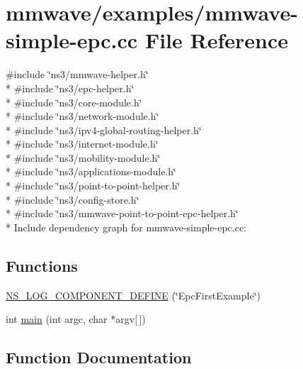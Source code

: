 \hypertarget{mmwave-simple-epc_8cc}{}\section{mmwave/examples/mmwave-\/simple-\/epc.cc File Reference}
\label{mmwave-simple-epc_8cc}
{\ttfamily \#include \char`\"{}ns3/mmwave-\/helper.\+h\char`\"{}}\\*
{\ttfamily \#include \char`\"{}ns3/epc-\/helper.\+h\char`\"{}}\\*
{\ttfamily \#include \char`\"{}ns3/core-\/module.\+h\char`\"{}}\\*
{\ttfamily \#include \char`\"{}ns3/network-\/module.\+h\char`\"{}}\\*
{\ttfamily \#include \char`\"{}ns3/ipv4-\/global-\/routing-\/helper.\+h\char`\"{}}\\*
{\ttfamily \#include \char`\"{}ns3/internet-\/module.\+h\char`\"{}}\\*
{\ttfamily \#include \char`\"{}ns3/mobility-\/module.\+h\char`\"{}}\\*
{\ttfamily \#include \char`\"{}ns3/applications-\/module.\+h\char`\"{}}\\*
{\ttfamily \#include \char`\"{}ns3/point-\/to-\/point-\/helper.\+h\char`\"{}}\\*
{\ttfamily \#include \char`\"{}ns3/config-\/store.\+h\char`\"{}}\\*
{\ttfamily \#include \char`\"{}ns3/mmwave-\/point-\/to-\/point-\/epc-\/helper.\+h\char`\"{}}\\*
Include dependency graph for mmwave-\/simple-\/epc.cc\+:
\subsection*{Functions}
\begin{DoxyCompactItemize}
\item 
\hyperlink{mmwave-simple-epc_8cc_ab5b2d5577332f9a2c1d6b2d32293401e}{N\+S\+\_\+\+L\+O\+G\+\_\+\+C\+O\+M\+P\+O\+N\+E\+N\+T\+\_\+\+D\+E\+F\+I\+NE} (\char`\"{}Epc\+First\+Example\char`\"{})
\item 
int \hyperlink{mmwave-simple-epc_8cc_a0ddf1224851353fc92bfbff6f499fa97}{main} (int argc, char $\ast$argv\mbox{[}$\,$\mbox{]})
\end{DoxyCompactItemize}


\subsection{Function Documentation}

